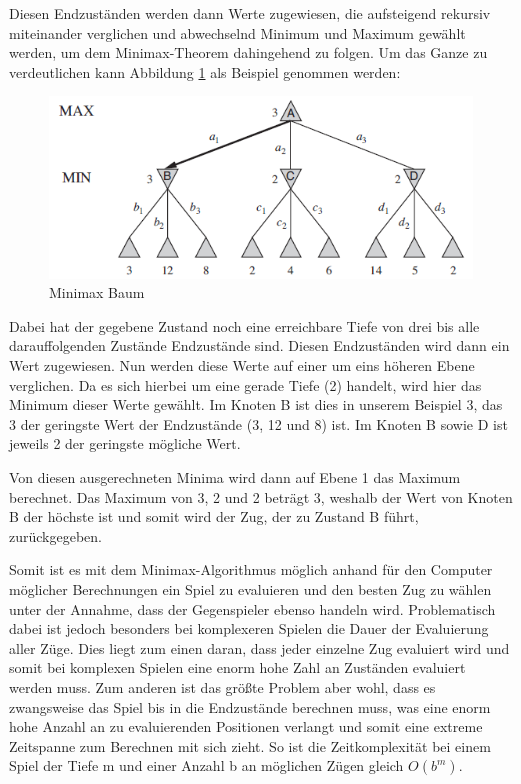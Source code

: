Diesen Endzuständen werden dann Werte zugewiesen, die aufsteigend rekursiv miteinander verglichen und abwechselnd Minimum und Maximum gewählt werden, um dem Minimax-Theorem dahingehend zu folgen. Um das Ganze zu verdeutlichen kann Abbildung \ref{fig:minimax_tree} als Beispiel genommen werden:

\begin{figure}[h]
\centering
\includegraphics[width=\textwidth/5*4]{images/minimax_algorithm_tree.PNG}

\caption{Minimax Baum \cite{Russell2010}}\label{fig:minimax_tree}
\end{figure}

Dabei hat der gegebene Zustand noch eine erreichbare Tiefe von drei bis alle darauffolgenden Zustände Endzustände sind. Diesen Endzuständen wird dann ein Wert zugewiesen. Nun werden diese Werte auf einer um eins höheren Ebene verglichen. Da es sich hierbei um eine gerade Tiefe (2) handelt, wird hier das Minimum dieser Werte gewählt. Im Knoten B ist dies in unserem Beispiel 3, das 3 der geringste Wert der Endzustände (3, 12 und 8) ist. Im Knoten B sowie D ist jeweils 2 der geringste mögliche Wert. 

Von diesen ausgerechneten Minima wird dann auf Ebene 1 das Maximum berechnet. Das Maximum von 3, 2 und 2 beträgt 3, weshalb der Wert von Knoten B der höchste ist und somit wird der Zug, der zu Zustand B führt, zurückgegeben.

Somit ist es mit dem Minimax-Algorithmus möglich anhand für den Computer möglicher Berechnungen ein Spiel zu evaluieren und den besten Zug zu wählen unter der Annahme, dass der Gegenspieler ebenso handeln wird. Problematisch dabei ist jedoch besonders bei komplexeren Spielen die Dauer der Evaluierung aller Züge. Dies liegt zum einen daran, dass jeder einzelne Zug evaluiert wird und somit bei komplexen Spielen eine enorm hohe Zahl an Zuständen evaluiert werden muss. Zum anderen ist das größte Problem aber wohl, dass es zwangsweise das Spiel bis in die Endzustände berechnen muss, was eine enorm hohe Anzahl an zu evaluierenden Positionen verlangt und somit eine extreme Zeitspanne zum Berechnen mit sich zieht. So ist die Zeitkomplexität bei einem Spiel der Tiefe m und einer Anzahl b an möglichen Zügen gleich $O(b^m)$. \cite[S.169]{Russell2010}


